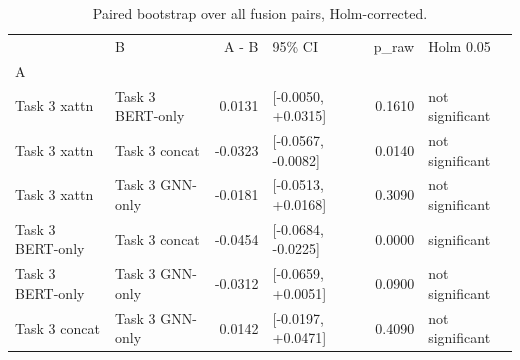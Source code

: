 \begin{table}[t]
\caption{Paired bootstrap over all fusion pairs, Holm-corrected.}
\label{tab:t3boot}
\begin{tabular}{llrlrl}
\toprule
 & B & A - B & 95\% CI & p\_raw & Holm 0.05 \\
A &  &  &  &  &  \\
\midrule
Task 3 xattn & Task 3 BERT-only & 0.0131 & [-0.0050, +0.0315] & 0.1610 & not significant \\
Task 3 xattn & Task 3 concat & -0.0323 & [-0.0567, -0.0082] & 0.0140 & not significant \\
Task 3 xattn & Task 3 GNN-only & -0.0181 & [-0.0513, +0.0168] & 0.3090 & not significant \\
Task 3 BERT-only & Task 3 concat & -0.0454 & [-0.0684, -0.0225] & 0.0000 & significant \\
Task 3 BERT-only & Task 3 GNN-only & -0.0312 & [-0.0659, +0.0051] & 0.0900 & not significant \\
Task 3 concat & Task 3 GNN-only & 0.0142 & [-0.0197, +0.0471] & 0.4090 & not significant \\
\bottomrule
\end{tabular}
\end{table}
